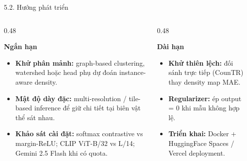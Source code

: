 \documentclass[11pt]{beamer}
\begin{document}
\begin{frame}{5.2. Hướng phát triển}
\scriptsize

\begin{columns}[T,onlytextwidth]

\begin{column}{0.48\textwidth}
\begin{block}{\textbf{Ngắn hạn}}
\begin{itemize}\setlength{\itemsep}{2pt}
  \item \textbf{Khử phân mảnh:} graph-based clustering, watershed hoặc head phụ dự đoán instance-aware density.
  \item \textbf{Mật độ dày đặc:} multi-resolution / tile-based inference để giữ chi tiết tại biên vật thể sát nhau.
  \item \textbf{Khảo sát cài đặt:} softmax contrastive vs margin-ReLU; CLIP ViT-B/32 vs L/14; Gemini 2.5 Flash khi có quota.
\end{itemize}
\end{block}
\end{column}

\begin{column}{0.48\textwidth}
\begin{block}{\textbf{Dài hạn}}
\begin{itemize}\setlength{\itemsep}{2pt}
  \item \textbf{Khử thiên lệch:} đối sánh trực tiếp (CounTR) thay density map MAE.
  \item \textbf{Regularizer:} ép output = 0 khi mẫu không hợp lệ.
  \item \textbf{Triển khai:} Docker + HuggingFace Spaces / Vercel deployment.
\end{itemize}
\end{block}
\end{column}

\end{columns}

\end{frame}
\end{document}
